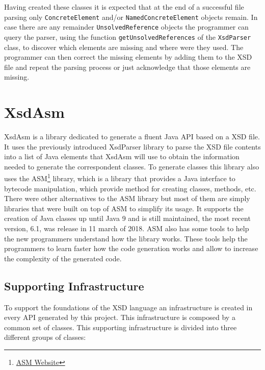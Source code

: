 \noindent
Having created these classes it is expected that at the end of a successful file parsing only \texttt{ConcreteElement} and/or \texttt{NamedConcreteElement} objects remain. In case there are any remainder \texttt{UnsolvedReference} objects the programmer can query the parser, using the function \texttt{getUnsolvedReferences} of the \texttt{XsdParser} class, to discover which elements are missing and where were they used. The programmer can then correct the missing elements by adding them to the \ac{XSD} file and repeat the parsing process or just acknowledge that those elements are missing. 

\section{XsdAsm} %
\label{sec:xsdasm}

XsdAsm is a library dedicated to generate a fluent Java \ac{API} based on a \ac{XSD} file. It uses the previously introduced XsdParser library to parse the \ac{XSD} file contents into a list of Java elements that XsdAsm will use to obtain the information needed to generate the correspondent classes. To generate classes this library also uses the ASM\footnote{\href{http://asm.ow2.org/}{ASM Website}} library, which is a library that provides a Java interface to bytecode manipulation, which provide method for creating classes, methods, etc. There were other alternatives to the ASM library but most of them are simply libraries that were built on top of ASM to simplify its usage. It supports the creation of Java classes up until Java 9 and is still maintained, the most recent version, 6.1, was release in 11 march of 2018. ASM also has some tools to help the new programmers understand how the library works. These tools help the programmers to learn faster how the code generation works and allow to increase the complexity of the generated code.

\subsection{Supporting Infrastructure}
\label{sec:supportinginfrastructure}

To support the foundations of the \ac{XSD} language an infrastructure is created in every \ac{API} generated by this project. This infrastructure is composed by a common set of classes. This supporting infrastructure is divided into three different groups of classes:

\newpage


